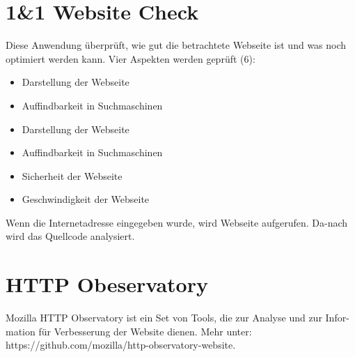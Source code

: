 \section{1\&1 Website Check}

Diese Anwendung überprüft, wie gut die betrachtete Webseite ist und was noch optimiert werden kann. Vier Aspekten werden geprüft (6):
\begin{itemize}
	\item Darstellung der Webseite
	\item Auffindbarkeit in Suchmaschinen
	\item Darstellung der Webseite
	\item Auffindbarkeit in Suchmaschinen
	\item Sicherheit der Webseite
	\item Geschwindigkeit der Webseite
\end{itemize}

Wenn die Internetadresse eingegeben wurde, wird Webseite aufgerufen. Da-nach wird das Quellcode analysiert.

\section{HTTP Obeservatory}

Mozilla HTTP Observatory ist ein Set von Tools, die zur Analyse und zur Infor-mation für Verbesserung der Website dienen. Mehr unter: https://github.com/mozilla/http-observatory-website.

